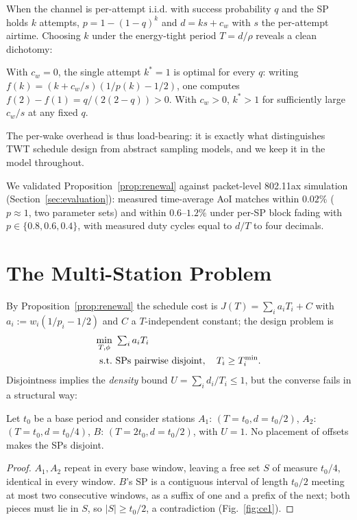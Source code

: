 When the channel is per-attempt i.i.d. with success probability $q$ and the
SP holds $k$ attempts, $p = 1-(1-q)^k$ and $d = k s + c_w$ with $s$ the
per-attempt airtime. Choosing $k$ under the energy-tight period
$T = d/\rho$ reveals a clean dichotomy:

\begin{lemma}
\label{lem:batching}
With $c_w = 0$, the single attempt $k^*=1$ is optimal for every $q$: writing
$f(k) = (k + c_w/s)(1/p(k) - 1/2)$, one computes
$f(2)-f(1) = q/(2(2-q)) > 0$. With $c_w > 0$, $k^* > 1$ for sufficiently
large $c_w/s$ at any fixed $q$.
\end{lemma}

The per-wake overhead is thus load-bearing: it is exactly what distinguishes
TWT schedule design from abstract sampling models, and we keep it in the
model throughout.

We validated Proposition~\ref{prop:renewal} against packet-level 802.11ax
simulation (Section~\ref{sec:evaluation}): measured time-average AoI
matches within $0.02\%$ ($p \approx 1$, two parameter sets) and within
$0.6$--$1.2\%$ under per-SP block fading with $p \in \{0.8, 0.6, 0.4\}$,
with measured duty cycles equal to $d/T$ to four decimals.

\section{The Multi-Station Problem}
\label{sec:problem}

By Proposition~\ref{prop:renewal} the schedule cost is
$J(T) = \sum_i a_i T_i + C$ with $a_i := w_i(1/p_i - 1/2)$ and $C$ a
$T$-independent constant; the design problem is
\begin{align}
\min_{T, \phi}\ & \textstyle\sum_i a_i T_i \nonumber\\
\text{s.t.}\ & \text{SPs pairwise disjoint},\quad T_i \ge T^{\min}_i.
\label{eq:problem}
\end{align}
Disjointness implies the \emph{density} bound $U = \sum_i d_i/T_i \le 1$,
but the converse fails in a structural way:

\begin{proposition}
\label{prop:ce}
Let $t_0$ be a base period and consider stations $A_1$: $(T{=}t_0,
d{=}t_0/2)$, $A_2$: $(T{=}t_0, d{=}t_0/4)$, $B$: $(T{=}2t_0, d{=}t_0/2)$,
with $U = 1$. No placement of offsets makes the SPs disjoint.
\end{proposition}

\begin{proof}
$A_1, A_2$ repeat in every base window, leaving a free set $S$ of measure
$t_0/4$, identical in every window. $B$'s SP is a contiguous interval of
length $t_0/2$ meeting at most two consecutive windows, as a suffix of one
and a prefix of the next; both pieces must lie in $S$, so $|S| \ge t_0/2$,
a contradiction (Fig.~\ref{fig:ce1}).
\end{proof}

